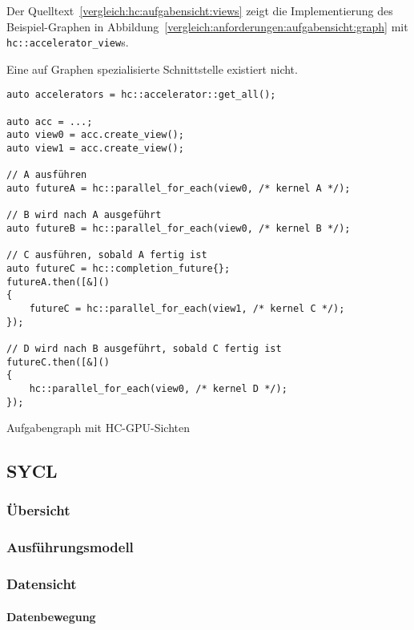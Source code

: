Der Quelltext~\ref{vergleich:hc:aufgabensicht:views} zeigt die
Implementierung des Beispiel-Graphen
in Abbildung~\ref{vergleich:anforderungen:aufgabensicht:graph} mit
\texttt{hc::accelerator\_view}s.

Eine auf Graphen spezialisierte Schnittstelle existiert nicht.

\begin{code}
    \begin{verbatim}
auto accelerators = hc::accelerator::get_all();

auto acc = ...;
auto view0 = acc.create_view();
auto view1 = acc.create_view();
        
// A ausführen
auto futureA = hc::parallel_for_each(view0, /* kernel A */);

// B wird nach A ausgeführt
auto futureB = hc::parallel_for_each(view0, /* kernel B */);

// C ausführen, sobald A fertig ist
auto futureC = hc::completion_future{};
futureA.then([&]()
{
    futureC = hc::parallel_for_each(view1, /* kernel C */);
});

// D wird nach B ausgeführt, sobald C fertig ist
futureC.then([&]()
{
    hc::parallel_for_each(view0, /* kernel D */);
});
    \end{verbatim}
    \caption{Aufgabengraph mit HC-GPU-Sichten}
    \label{vergleich:hc:aufgabensicht:views}
\end{code}


\subsection{SYCL}
\label{vergleich:sycl}

\subsubsection{Übersicht}

\subsubsection{Ausführungsmodell}

\subsubsection{Datensicht}

\paragraph{Datenbewegung}

